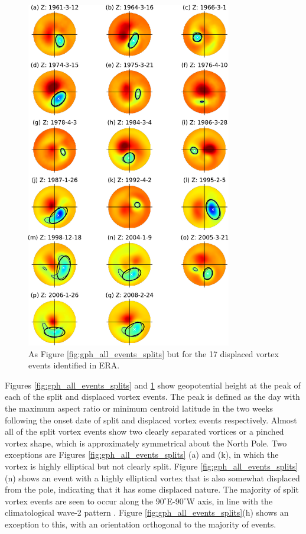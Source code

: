 \begin{figure}[htbp]
 \centering
 \noindent\includegraphics[width=0.8\textwidth]{figures/chapter-moments/GPH_all_events_displs.pdf}
 \caption[Geopotential height at the peak of displaced vortex events.]{As Figure
   \ref{fig:gph_all_events_splits} but for the 17 displaced vortex events
   identified in ERA.}
 \label{fig:gph_all_events_displs}
\end{figure}

Figures \ref{fig:gph_all_events_splits} and \ref{fig:gph_all_events_displs} show
geopotential height at the peak of each of the split and displaced vortex
events. The peak is defined as the day with the maximum aspect ratio or minimum
centroid latitude in the two weeks following the onset date of split and
displaced vortex events respectively. Almost all of the split vortex events show
two clearly separated vortices or a pinched vortex shape, which is approximately
symmetrical about the North Pole. Two exceptions are Figures
\ref{fig:gph_all_events_splits} (a) and (k), in which the vortex is highly
elliptical but not clearly split. Figure \ref{fig:gph_all_events_splits}(n)
shows an event with a highly elliptical vortex that is also somewhat displaced
from the pole, indicating that it has some displaced nature. The majority of
split vortex events are seen to occur along the $90^{\circ}$E-$90^{\circ}$W
axis, in line with the climatological wave-2 pattern \citep{Andrews1987}. Figure
\ref{fig:gph_all_events_splits}(h) shows an exception to this, with an
orientation orthogonal to the majority of events. 

